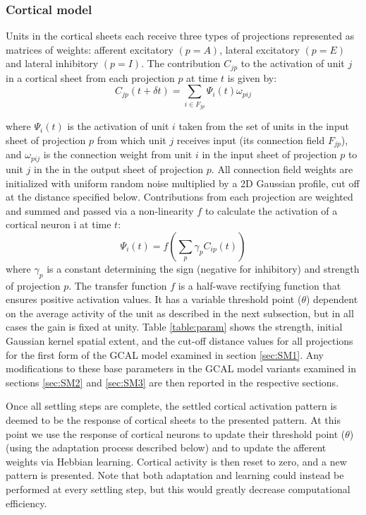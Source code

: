 \documentclass[a4paper,10pt]{article}
\begin{document}
\subsubsection{Cortical model}

Units in the cortical sheets each receive three types of projections represented as matrices of weights: afferent excitatory $(p=A)$, 
lateral excitatory $(p=E)$ and lateral inhibitory $(p=I)$.  The contribution $C_{jp}$ to the activation of unit $j$ in a cortical sheet from each projection $p$ at time $t$ is given by: 
\begin{equation} 
C_{jp}(t+\delta t)=\sum_{i\in F_{jp}}\Psi_{i}(t)\omega_{pij} 
\end{equation} 

\noindent where $\Psi_{i}(t)$ is the activation of unit $i$ taken from the set of units in the input
sheet of projection $p$ from which unit $j$ receives input (its connection field $F_{jp}$), and $\omega_{pij}$ is the connection
weight from unit $i$ in the input sheet of projection $p$ to unit $j$ in the in the output sheet of projection $p$. All connection field
weights are initialized with uniform random noise multiplied by a 2D Gaussian profile, cut off at the distance specified below.
Contributions from each projection are weighted and summed and passed via a non-linearity $f$ to calculate the activation of a cortical neuron i at time $t$:
\begin{equation}
\Psi_{i}(t)= f(\sum_{p}\gamma_{p}C_{ip}(t))
\end{equation}
where $\gamma_{p}$ is a constant determining the sign (negative for inhibitory) and strength of projection $p$. 
The transfer function $f$ is a half-wave rectifying function that ensures positive activation values. It has a 
variable threshold point ($\theta$) dependent on the average activity of the unit as described in the next subsection, 
but in all cases the gain is fixed at unity. Table \ref{table:param} shows the strength, initial Gaussian kernel spatial extent, and the cut-off distance values for all projections for the first form of the GCAL model examined in section \ref{sec:SM1}. Any modifications to these base parameters 
in the GCAL model variants examined in sections \ref{sec:SM2} and \ref{sec:SM3} are then reported in the respective sections.

Once all  settling steps are complete, the settled cortical activation pattern is deemed to be the response of cortical sheets to 
the presented pattern. At this point we use the response of cortical neurons to update their threshold point ($\theta$) (using the adaptation process described below) and to update the afferent weights via Hebbian learning. Cortical activity is then reset to zero, and a new pattern is presented. Note that both adaptation and learning could instead be performed at every settling step, but this would greatly decrease computational efficiency.
\end{document}
